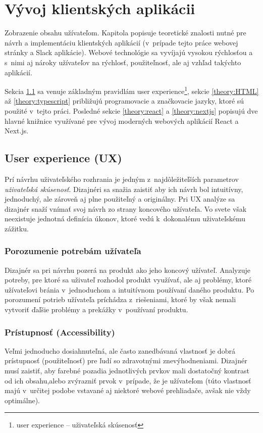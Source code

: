 \chapter{Vývoj klientských aplikácii}
\label{theory:client_dev}
Zobrazenie obsahu užívateľom. Kapitola popisuje teoretické znalosti nutné pre návrh a implementáciu klientských aplikácií (v~prípade tejto práce webovej stránky a Slack aplikácie). Webové technológie sa vyvíjajú vysokou rýchlosťou a s~nimi aj nároky užívateľov na rýchlosť, použiteľnosť, ale aj vzhľad takýchto aplikácií.

Sekcia \ref{theory:UX} sa venuje základným pravidlám user experience\footnote{user experience -- uživateľská skúsenosť}, sekcie \ref{theory:HTML} až \ref{theory:typescript} približujú programovacie a značkovacie jazyky, ktoré sú použité v~tejto práci. Posledné sekcie \ref{theory:react} a \ref{theory:nextjs} popisujú dve hlavné knižnice využívané pre vývoj moderných webových aplikácií React a Next.js.

\section{User experience (UX)}
\label{theory:UX}
Prí návrhu uživateľského rozhrania je jedným z~najdôležiteľších parametrov \emph{uživateľská skúsenosť}. Dizajnéri sa snažia zaistiť aby ich návrh bol intuitívny, jednoduchý, ale zároveň aj plne použiteľný a originálny. Pri UX analýze sa dizajnér snaží vnímať svoj návrh zo strany koncového užívateľa. Vo svete však neexistuje jednotná definícia úkonov, ktoré vedú k~dokonalému uživateľskému zážitku.

\subsection{Porozumenie potrebám užívateľa}
Dizajnér sa pri návrhu pozerá na produkt ako jeho koncový užívateľ. Analyzuje potreby, pre ktoré sa uživateľ rozhodol produkt využívať, ale aj problémy, ktoré užívateľovi bránia v~jednoduchom a intuitívnom používaní daného produktu. Po porozumení potrieb užívateľa príchádza z~riešeniami, ktoré by však nemali vytvoriť ďaľšie problémy a prekážky v~používaní produktu.

\subsection{Prístupnosť (Accessibility)}
Veľmi jednoducho dosiahnuteľná, ale často zanedbávaná vlastnosť je dobrá prístupnosť (použiteľnosť) pre ľudí so zdravotnými znevýhodneniami. Dizajnér musí zaistiť, aby farebné pozadia jednotlivých prvkov mali dostatočný kontrast od ich obsahu,alebo zvýrazniť prvok v~prípade, že je užívateľom (túto vlastnosť majú v~určitej podobe vstavané aj niektoré webové prehliadače, avšak nie vždy optimálne).

